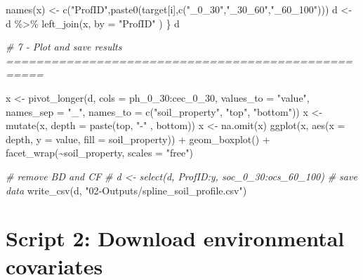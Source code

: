 \documentclass[
  10pt,
  b5paper,
  oneside]{book}
\newenvironment{Shaded}{\begin{snugshade}}{\end{snugshade}}
\newcommand{\AttributeTok}[1]{\textcolor[rgb]{0.77,0.63,0.00}{#1}}
\newcommand{\CommentTok}[1]{\textcolor[rgb]{0.56,0.35,0.01}{\textit{#1}}}
\newcommand{\FunctionTok}[1]{\textcolor[rgb]{0.00,0.00,0.00}{#1}}
\newcommand{\NormalTok}[1]{#1}
\newcommand{\OtherTok}[1]{\textcolor[rgb]{0.56,0.35,0.01}{#1}}
\newcommand{\SpecialCharTok}[1]{\textcolor[rgb]{0.00,0.00,0.00}{#1}}
\newcommand{\StringTok}[1]{\textcolor[rgb]{0.31,0.60,0.02}{#1}}
\begin{document}
\begin{Shaded}
\begin{Highlighting}[]
  \FunctionTok{names}\NormalTok{(x) }\OtherTok{\textless{}{-}} \FunctionTok{c}\NormalTok{(}\StringTok{"ProfID"}\NormalTok{,}\FunctionTok{paste0}\NormalTok{(target[i],}\FunctionTok{c}\NormalTok{(}\StringTok{"\_0\_30"}\NormalTok{,}\StringTok{"\_30\_60"}\NormalTok{,}\StringTok{"\_60\_100"}\NormalTok{)))}
\NormalTok{  d }\OtherTok{\textless{}{-}}\NormalTok{ d }\SpecialCharTok{\%\textgreater{}\%} \FunctionTok{left\_join}\NormalTok{(x, }\AttributeTok{by =} \StringTok{"ProfID"}\NormalTok{ )}
\NormalTok{\}}
\NormalTok{d}


\CommentTok{\# 7 {-} Plot  and save results ===================================================}

\NormalTok{x }\OtherTok{\textless{}{-}} \FunctionTok{pivot\_longer}\NormalTok{(d, }\AttributeTok{cols =}\NormalTok{ ph\_0\_30}\SpecialCharTok{:}\NormalTok{cec\_0\_30, }\AttributeTok{values\_to =} \StringTok{"value"}\NormalTok{,}
                  \AttributeTok{names\_sep =} \StringTok{"\_"}\NormalTok{, }
                  \AttributeTok{names\_to =} \FunctionTok{c}\NormalTok{(}\StringTok{"soil\_property"}\NormalTok{, }\StringTok{"top"}\NormalTok{, }\StringTok{"bottom"}\NormalTok{))}
\NormalTok{x }\OtherTok{\textless{}{-}} \FunctionTok{mutate}\NormalTok{(x, }\AttributeTok{depth =} \FunctionTok{paste}\NormalTok{(top, }\StringTok{"{-}"}\NormalTok{ , bottom))}
\NormalTok{x }\OtherTok{\textless{}{-}} \FunctionTok{na.omit}\NormalTok{(x)}
\FunctionTok{ggplot}\NormalTok{(x, }\FunctionTok{aes}\NormalTok{(}\AttributeTok{x =}\NormalTok{ depth, }\AttributeTok{y =}\NormalTok{ value, }\AttributeTok{fill =}\NormalTok{ soil\_property)) }\SpecialCharTok{+}
  \FunctionTok{geom\_boxplot}\NormalTok{() }\SpecialCharTok{+} 
  \FunctionTok{facet\_wrap}\NormalTok{(}\SpecialCharTok{\textasciitilde{}}\NormalTok{soil\_property, }\AttributeTok{scales =} \StringTok{"free"}\NormalTok{)}

\CommentTok{\# remove BD and CF}
\CommentTok{\# d \textless{}{-} select(d, ProfID:y, soc\_0\_30:ocs\_60\_100)}
\CommentTok{\# save data}
\FunctionTok{write\_csv}\NormalTok{(d, }\StringTok{"02{-}Outputs/spline\_soil\_profile.csv"}\NormalTok{)}
\end{Highlighting}
\end{Shaded}

\hypertarget{script-2-download-environmental-covariates}{%
\section*{Script 2: Download environmental covariates}\label{script-2-download-environmental-covariates}}
\end{document}
